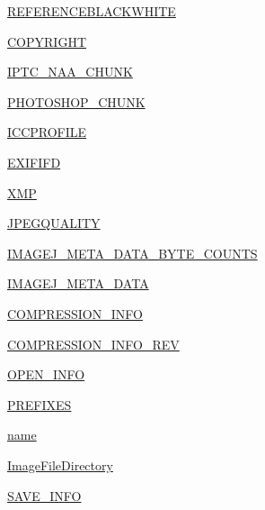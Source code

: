 \begin{DoxyCompactItemize}
\item 
\hyperlink{namespacePIL_1_1TiffImagePlugin_a168bbf7441bd137e7b928e02d0b1c50f}{R\+E\+F\+E\+R\+E\+N\+C\+E\+B\+L\+A\+C\+K\+W\+H\+I\+TE}
\item 
\hyperlink{namespacePIL_1_1TiffImagePlugin_aa36fdcf3129123dde3bea617c75edf2a}{C\+O\+P\+Y\+R\+I\+G\+HT}
\item 
\hyperlink{namespacePIL_1_1TiffImagePlugin_a020bdf72ed69bb8e70db4f4d9cafe4da}{I\+P\+T\+C\+\_\+\+N\+A\+A\+\_\+\+C\+H\+U\+NK}
\item 
\hyperlink{namespacePIL_1_1TiffImagePlugin_adf1c0cf9579975f7438e92dada108bed}{P\+H\+O\+T\+O\+S\+H\+O\+P\+\_\+\+C\+H\+U\+NK}
\item 
\hyperlink{namespacePIL_1_1TiffImagePlugin_a6532786bb6ae945906b6bed269a8bbb9}{I\+C\+C\+P\+R\+O\+F\+I\+LE}
\item 
\hyperlink{namespacePIL_1_1TiffImagePlugin_a258d8ac50b2976dcf63897f6031ef7e8}{E\+X\+I\+F\+I\+FD}
\item 
\hyperlink{namespacePIL_1_1TiffImagePlugin_a46041ed290896ccc67be30c879dd5e1f}{X\+MP}
\item 
\hyperlink{namespacePIL_1_1TiffImagePlugin_a70ea53bf08187187854e7caf2fd8a602}{J\+P\+E\+G\+Q\+U\+A\+L\+I\+TY}
\item 
\hyperlink{namespacePIL_1_1TiffImagePlugin_ae4ed1a22b44dcc8e89dc715d90affc53}{I\+M\+A\+G\+E\+J\+\_\+\+M\+E\+T\+A\+\_\+\+D\+A\+T\+A\+\_\+\+B\+Y\+T\+E\+\_\+\+C\+O\+U\+N\+TS}
\item 
\hyperlink{namespacePIL_1_1TiffImagePlugin_aacc8e4cde1fceb76af0055bfd2cc546f}{I\+M\+A\+G\+E\+J\+\_\+\+M\+E\+T\+A\+\_\+\+D\+A\+TA}
\item 
\hyperlink{namespacePIL_1_1TiffImagePlugin_a9ecf1253357edd57e8cae2e4ce736202}{C\+O\+M\+P\+R\+E\+S\+S\+I\+O\+N\+\_\+\+I\+N\+FO}
\item 
\hyperlink{namespacePIL_1_1TiffImagePlugin_ab90a5c948cbeb152be034fff51dc92d1}{C\+O\+M\+P\+R\+E\+S\+S\+I\+O\+N\+\_\+\+I\+N\+F\+O\+\_\+\+R\+EV}
\item 
\hyperlink{namespacePIL_1_1TiffImagePlugin_ae43e1d9ff7aa2d3632a874c76a6ec378}{O\+P\+E\+N\+\_\+\+I\+N\+FO}
\item 
\hyperlink{namespacePIL_1_1TiffImagePlugin_a4c59dadcf77aabd87d1f8479f929160d}{P\+R\+E\+F\+I\+X\+ES}
\item 
\hyperlink{namespacePIL_1_1TiffImagePlugin_ae24fc2edfa933a3f68008eab738a0bc3}{name}
\item 
\hyperlink{namespacePIL_1_1TiffImagePlugin_a6b59d334b90c165d9f6c944beccf337e}{Image\+File\+Directory}
\item 
\hyperlink{namespacePIL_1_1TiffImagePlugin_a7b583e29cac8e74145974f13cdb70a7e}{S\+A\+V\+E\+\_\+\+I\+N\+FO}
\end{DoxyCompactItemize}


